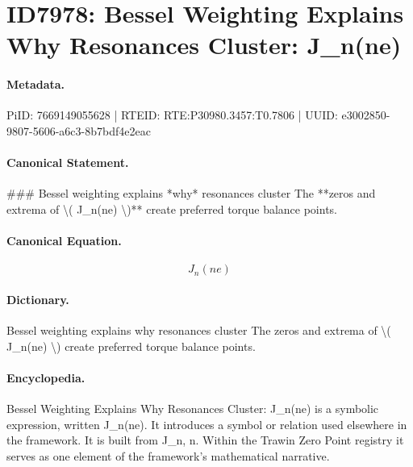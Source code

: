 \section*{ID7978: Bessel Weighting Explains Why Resonances Cluster: J\_n(ne)}
\paragraph{Metadata.}
PiID: 7669149055628 | RTEID: RTE:P30980.3457:T0.7806 | UUID: e3002850-9807-5606-a6c3-8b7bdf4e2eac

\paragraph{Canonical Statement.}
\#\#\# Bessel weighting explains *why* resonances cluster The **zeros and extrema of \textbackslash{}( J\_n(ne) \textbackslash{})** create preferred torque balance points.

\paragraph{Canonical Equation.}
\[
J_n(ne)
\]

\paragraph{Dictionary.}
Bessel weighting explains why resonances cluster The zeros and extrema of \textbackslash{}( J\_n(ne) \textbackslash{}) create preferred torque balance points.

\paragraph{Encyclopedia.}
Bessel Weighting Explains Why Resonances Cluster: J\_n(ne) is a symbolic expression, written J\_n(ne). It introduces a symbol or relation used elsewhere in the framework. It is built from J\_n, n. Within the Trawin Zero Point registry it serves as one element of the framework's mathematical narrative.

